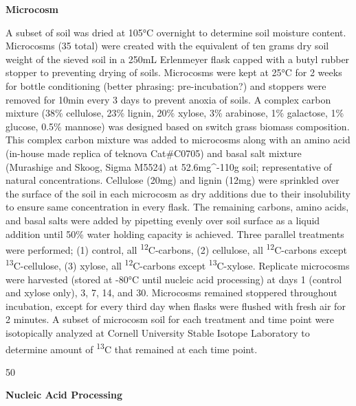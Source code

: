 \textbf{Microcosm}

A subset of soil was dried at 105°C overnight to determine soil moisture content. Microcosms (35 total) were created with the equivalent of ten grams dry soil weight of the sieved soil in a 250mL Erlenmeyer flask capped with a butyl rubber stopper to preventing drying of soils.  Microcosms were kept at 25°C for 2 weeks for bottle conditioning (better phrasing: pre-incubation?) and stoppers were removed for 10min every 3 days to prevent anoxia of soils. A complex carbon mixture (38\% cellulose, 23\% lignin, 20\% xylose, 3\% arabinose, 1\% galactose, 1\% glucose, 0.5\% mannose) was designed based on switch grass biomass composition.  This complex carbon mixture was added to microcosms along with an amino acid (in-house made replica of teknova Cat#C0705) and basal salt mixture (Murashige and Skoog, Sigma M5524) at 52.6mg^{-1}10g soil; representative of natural concentrations.  Cellulose (20mg) and lignin (12mg) were sprinkled over the surface of the soil in each microcosm as dry additions due to their insolubility to ensure same concentration in every flask. The remaining carbons, amino acids, and basal salts were added by pipetting evenly over soil surface as a liquid addition until 50\% water holding capacity is achieved.  Three parallel treatments were performed; (1) control, all \textsuperscript{12}C-carbons, (2) cellulose, all \textsuperscript{12}C-carbons except \textsuperscript{13}C-cellulose, (3) xylose, all \textsuperscript{12}C-carbons except \textsuperscript{13}C-xylose.  Replicate microcosms were harvested (stored at -80°C until nucleic acid processing) at days 1 (control and xylose only), 3, 7, 14, and 30.  Microcosms remained stoppered throughout incubation, except for every third day when flasks were flushed with fresh air for 2 minutes.  A subset of microcosm soil for each treatment and time point were isotopically analyzed at Cornell University Stable Isotope Laboratory to determine amount of \textsuperscript{13}C that remained at each time point.                       

50%



\textbf{Nucleic Acid Processing}

